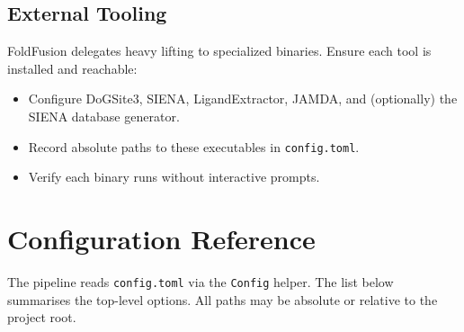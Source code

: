 \documentclass[11pt]{article}
\begin{document}
\subsection{External Tooling}
FoldFusion delegates heavy lifting to specialized binaries. Ensure each tool is
installed and reachable:
\begin{itemize}[noitemsep]
      \item Configure DoGSite3, SIENA, LigandExtractor, JAMDA, and (optionally) the
            SIENA database generator.
      \item Record absolute paths to these executables in \texttt{config.toml}.
      \item Verify each binary runs without interactive prompts.
\end{itemize}

\section{Configuration Reference}
The pipeline reads \texttt{config.toml} via the \texttt{Config} helper. The list
below summarises the top-level options. All paths may be absolute or relative to
the project root.
\end{document}
